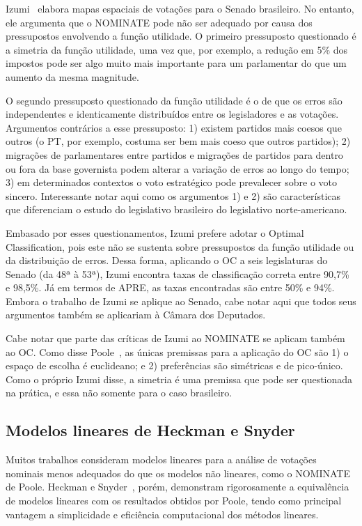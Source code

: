 \documentclass[a4paper, 12pt]{article}
\newcommand\nominate{NOMINATE\xspace}
\begin{document}
Izumi~\cite{izumi2016senado} elabora mapas espaciais de votações para o Senado brasileiro. No entanto, ele argumenta que o \nominate pode não ser adequado por causa dos pressupostos envolvendo a função utilidade. O primeiro pressuposto questionado é a simetria da função utilidade, uma vez que, por exemplo, a redução em 5\% dos impostos pode ser algo muito mais importante para um parlamentar do que um aumento da mesma magnitude.

O segundo pressuposto questionado da função utilidade é o de que os erros são independentes e identicamente distribuídos entre os legisladores e as votações. Argumentos contrários a esse pressuposto: 1) existem partidos mais coesos que outros (o PT, por exemplo, costuma ser bem mais coeso que outros partidos); 2) migrações de parlamentares entre partidos e migrações de partidos para dentro ou fora da base governista podem alterar a variação de erros ao longo do tempo;  3) em determinados contextos o voto estratégico pode prevalecer sobre o voto sincero. Interessante notar aqui como os argumentos 1) e 2) são características que diferenciam o estudo do legislativo brasileiro do legislativo norte-americano.

Embasado por esses questionamentos, Izumi prefere adotar o Optimal Classification, pois este não se sustenta sobre pressupostos da função utilidade ou da distribuição de erros. Dessa forma, aplicando o OC a seis legislaturas do Senado (da 48ª à 53ª), Izumi encontra taxas de classificação correta entre 90,7\% e 98,5\%. Já em termos de APRE, as taxas encontradas são entre 50\% e 94\%. Embora o trabalho de Izumi se aplique ao Senado, cabe notar aqui que todos seus argumentos também se aplicariam à Câmara dos Deputados.

Cabe notar que parte das críticas de Izumi ao \nominate se aplicam também ao OC. Como disse Poole~\cite{poole2000oc}, as únicas premissas para a aplicação do OC são 1) o espaço de escolha é euclideano; e 2) preferências são simétricas e de pico-único. Como o próprio Izumi disse, a simetria é uma premissa que pode ser questionada na prática, e essa não somente para o caso brasileiro.

\subsection{Modelos lineares de Heckman e Snyder}

Muitos trabalhos consideram modelos lineares para a análise de votações nominais menos adequados do que os modelos não lineares, como o \nominate de Poole. Heckman e Snyder~\cite{heckman-snyder1997}, porém, demonstram rigorosamente a equivalência de modelos lineares com os resultados obtidos por Poole, tendo como principal vantagem a simplicidade e eficiência computacional dos métodos lineares.
\end{document}
